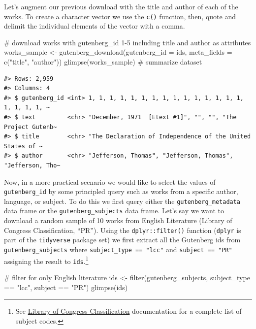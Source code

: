 \documentclass[
  letterpaper,
]{latex/krantz}
\newenvironment{Shaded}{\begin{snugshade}}{\end{snugshade}}
\newcommand{\AttributeTok}[1]{\textcolor[rgb]{0.40,0.45,0.13}{#1}}
\newcommand{\CommentTok}[1]{\textcolor[rgb]{0.37,0.37,0.37}{#1}}
\newcommand{\FunctionTok}[1]{\textcolor[rgb]{0.28,0.35,0.67}{#1}}
\newcommand{\NormalTok}[1]{\textcolor[rgb]{0.00,0.23,0.31}{#1}}
\newcommand{\OtherTok}[1]{\textcolor[rgb]{0.00,0.23,0.31}{#1}}
\newcommand{\SpecialCharTok}[1]{\textcolor[rgb]{0.37,0.37,0.37}{#1}}
\newcommand{\StringTok}[1]{\textcolor[rgb]{0.13,0.47,0.30}{#1}}
\begin{document}
Let's augment our previous download with the title and author of each of
the works. To create a character vector we use the \texttt{c()}
function, then, quote and delimit the individual elements of the vector
with a comma.

\begin{Shaded}
\begin{Highlighting}[]
\CommentTok{\# download works with \textasciigrave{}gutenberg\_id\textasciigrave{} 1{-}5 including \textasciigrave{}title\textasciigrave{} and \textasciigrave{}author\textasciigrave{} as attributes}
\NormalTok{works\_sample }\OtherTok{\textless{}{-}} \FunctionTok{gutenberg\_download}\NormalTok{(}\AttributeTok{gutenberg\_id =}\NormalTok{ ids, }
                            \AttributeTok{meta\_fields =} \FunctionTok{c}\NormalTok{(}\StringTok{"title"}\NormalTok{,}
                                            \StringTok{"author"}\NormalTok{))}
\FunctionTok{glimpse}\NormalTok{(works\_sample) }\CommentTok{\# summarize dataset}
\end{Highlighting}
\end{Shaded}

\begin{verbatim}
#> Rows: 2,959
#> Columns: 4
#> $ gutenberg_id <int> 1, 1, 1, 1, 1, 1, 1, 1, 1, 1, 1, 1, 1, 1, 1, 1, 1, 1, 1, ~
#> $ text         <chr> "December, 1971  [Etext #1]", "", "", "The Project Gutenb~
#> $ title        <chr> "The Declaration of Independence of the United States of ~
#> $ author       <chr> "Jefferson, Thomas", "Jefferson, Thomas", "Jefferson, Tho~
\end{verbatim}

Now, in a more practical scenario we would like to select the values of
\texttt{gutenberg\_id} by some principled query such as works from a
specific author, language, or subject. To do this we first query either
the \texttt{gutenberg\_metadata} data frame or the
\texttt{gutenberg\_subjects} data frame. Let's say we want to download a
random sample of 10 works from English Literature (Library of Congress
Classification, ``PR''). Using the \texttt{dplyr::filter()} function
(\texttt{dplyr} is part of the \texttt{tidyverse} package set) we first
extract all the Gutenberg ids from \texttt{gutenberg\_subjects} where
\texttt{subject\_type\ ==\ "lcc"} and \texttt{subject\ ==\ "PR"}
assigning the result to \texttt{ids}.\footnote{See
  \href{https://www.loc.gov/catdir/cpso/lcco/}{Library of Congress
  Classification} documentation for a complete list of subject codes.}

\begin{Shaded}
\begin{Highlighting}[]
\CommentTok{\# filter for only English literature}
\NormalTok{ids }\OtherTok{\textless{}{-}} 
  \FunctionTok{filter}\NormalTok{(gutenberg\_subjects, subject\_type }\SpecialCharTok{==} \StringTok{"lcc"}\NormalTok{, subject }\SpecialCharTok{==} \StringTok{"PR"}\NormalTok{)}
\FunctionTok{glimpse}\NormalTok{(ids)}
\end{Highlighting}
\end{Shaded}
\end{document}

